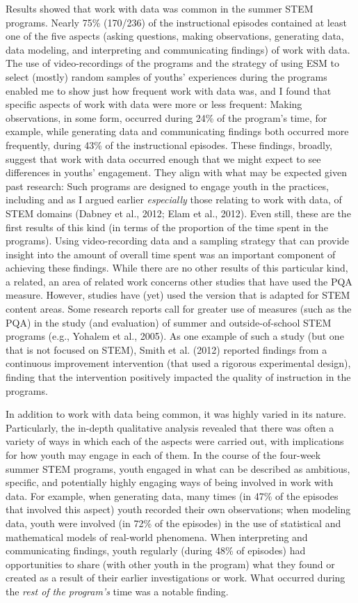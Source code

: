 \documentclass[]{msu-thesis}
\theoremstyle{definition}
\theoremstyle{definition}
\theoremstyle{definition}
\theoremstyle{remark}
\begin{document}
Results showed that work with data was common in the summer STEM
programs. Nearly 75\% (170/236) of the instructional episodes contained
at least one of the five aspects (asking questions, making observations,
generating data, data modeling, and interpreting and communicating
findings) of work with data. The use of video-recordings of the programs
and the strategy of using ESM to select (mostly) random samples of
youths' experiences during the programs enabled me to show just how
frequent work with data was, and I found that specific aspects of work
with data were more or less frequent: Making observations, in some form,
occurred during 24\% of the program's time, for example, while
generating data and communicating findings both occurred more
frequently, during 43\% of the instructional episodes. These findings,
broadly, suggest that work with data occurred enough that we might
expect to see differences in youths' engagement. They align with what
may be expected given past research: Such programs are designed to
engage youth in the practices, including and as I argued earlier
\emph{especially} those relating to work with data, of STEM domains
(Dabney et al., 2012; Elam et al., 2012). Even still, these are the
first results of this kind (in terms of the proportion of the time spent
in the programs). Using video-recording data and a sampling strategy
that can provide insight into the amount of overall time spent was an
important component of achieving these findings. While there are no
other results of this particular kind, a related, an area of related
work concerns other studies that have used the PQA measure. However,
studies have (yet) used the version that is adapted for STEM content
areas. Some research reports call for greater use of measures (such as
the PQA) in the study (and evaluation) of summer and outside-of-school
STEM programs (e.g., Yohalem et al., 2005). As one example of such a
study (but one that is not focused on STEM), Smith et al. (2012)
reported findings from a continuous improvement intervention (that used
a rigorous experimental design), finding that the intervention
positively impacted the quality of instruction in the programs.

In addition to work with data being common, it was highly varied in its
nature. Particularly, the in-depth qualitative analysis revealed that
there was often a variety of ways in which each of the aspects were
carried out, with implications for how youth may engage in each of them.
In the course of the four-week summer STEM programs, youth engaged in
what can be described as ambitious, specific, and potentially highly
engaging ways of being involved in work with data. For example, when
generating data, many times (in 47\% of the episodes that involved this
aspect) youth recorded their own observations; when modeling data, youth
were involved (in 72\% of the episodes) in the use of statistical and
mathematical models of real-world phenomena. When interpreting and
communicating findings, youth regularly (during 48\% of episodes) had
opportunities to share (with other youth in the program) what they found
or created as a result of their earlier investigations or work. What
occurred during the \emph{rest of the program's} time was a notable
finding.
\end{document}
